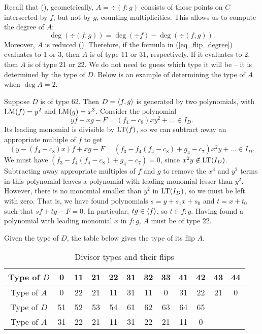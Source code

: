 Recall that (), geometrically, $A = \div(f : g)$ consists of those points on $C$ intersected by $f$, but not by $g$, counting multiplicities.
This allows us to compute the degree of $A$:
\begin{equation}
  \label{eq_flip_degree}
  \deg(\div(f : g)) = \deg(\div f) - \deg(\div(f,g)).
\end{equation}
Moreover, $A$ is reduced ().
Therefore, if the formula in (\ref{eq_flip_degree}) evaluates to 1 or 3, then $A$ is of type 11 or 31, respectively.
If it evaluates to 2, then $A$ is of type 21 or 22.
We do not need to guess which type it will be -- it is determined by the type of $D$.
Below is an example of determining the type of $A$ when $\deg A = 2$.
\begin{example}
  Suppose $D$ is of type 62.
  Then $D = \left\langle f,g \right\rangle$ is generated by two polynomials, with $\operatorname{LM}(f) = y^2$ and $\operatorname{LM}(g) = x^3$.
  Consider the polynomial
    \[ yf + xg - F = (f_4 - c_8)xy^2 + \dots \in I_D. \]
  Its leading monomial is divisible by $\operatorname{LT}(f)$, so we can subtract away an appropriate multiple of $f$ to get
    \[ (y - (f_4 - c_8)x)f + xg - F = (f_3 - f_4(f_4 - c_8) + g_4 - c_7)x^2y + \dots \in I_D. \]
  We must have $(f_3 - f_4(f_4 - c_8) + g_4 - c_7) = 0$, since $x^2y \not\in \operatorname{LT}(I_D)$.
  Subtracting away appropriate multiples of $f$ and $g$ to remove the $x^3$ and $y^2$ terms in this polynomial
  leaves a polynomial with leading monomial lesser than $y^2$.
  However, there is no monomial smaller than $y^2$ in $\operatorname{LT}(I_D)$, so we must be left with zero.
  That is, we have found polynomials $s = y + s_1x + s_0$ and $t = x + t_0$ such that $sf + tg - F = 0$.
  In particular, $tg \in \left\langle f \right\rangle$, so $t \in f : g$.
  Having found a polynomial with leading monomial $x$ in $f : g$, $A$ must be of type 22.
\end{example}

Given the type of $D$, the table below gives the type of its flip $A$.
\begin{table}
  \label{table_divisor_flips}
  \caption{Divisor types and their flips}
  \begin{center}
  \begin{tabular}{|c|ccccccccccc|}
    \hline
    Type of $D$ & 0 & 11 & 21 & 22 & 31 & 32 & 33 & 41 & 42 & 43 & 44 \\
    \hline
    Type of $A$ & 0 & 22 & 21 & 11 & 31 & 11 & 0  & 31 & 22 & 21 &  0 \\
    \hline \hline
    Type of $D$ & 51 & 52 & 53 & 54 & 61 & 62 & 63 & 64 & 65 \\
    \hline
    Type of $A$ & 31 & 22 & 21 & 11 & 31 & 22 & 21 & 11 & 0 \\
    \hline
  \end{tabular}
  \end{center}
\end{table}

